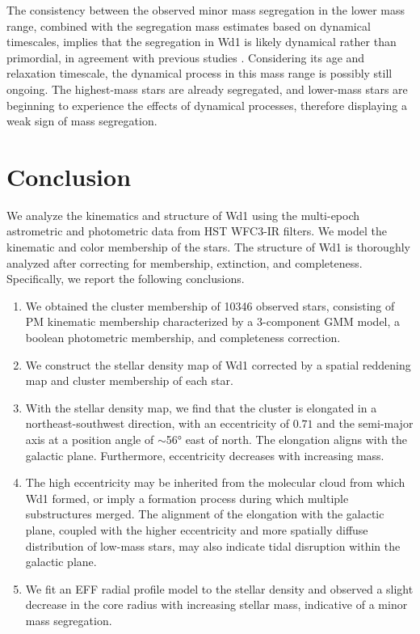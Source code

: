 \documentclass[12pt]{ucsddissertation}
\begin{document}
\begin{CJK*}{UTF8}{gbsn}
The consistency between the observed minor mass segregation in the lower mass range, combined with the segregation mass estimates based on dynamical timescales, implies that the segregation in Wd1 is likely dynamical rather than primordial, in agreement with previous studies \citep[][]{Gennaro-2017}. Considering its age and relaxation timescale, the dynamical process in this mass range is possibly still ongoing. The highest-mass stars are already segregated, and lower-mass stars are beginning to experience the effects of dynamical processes, therefore displaying a weak sign of mass segregation.


\section{Conclusion}
\label{wd1-sec:conclusion}
We analyze the kinematics and structure of Wd1 using the multi-epoch astrometric and photometric data from HST WFC3-IR filters. We model the kinematic and color membership of the stars. The structure of Wd1 is thoroughly analyzed after correcting for membership, extinction, and completeness. Specifically, we report the following conclusions.
\begin{enumerate}[label=\roman*.]
    \item We obtained the cluster membership of \num{10346} observed stars, consisting of PM kinematic membership characterized by a 3-component GMM model, a boolean photometric membership, and completeness correction.
    \item We construct the stellar density map of Wd1 corrected by a spatial reddening map and cluster membership of each star.
    \item With the stellar density map, we find that the cluster is elongated in a northeast-southwest direction, with an eccentricity of $0.71$ and the semi-major axis at a position angle of $\sim$\ang{56} east of north. The elongation aligns with the galactic plane. Furthermore, eccentricity decreases with increasing mass.
    \item The high eccentricity may be inherited from the molecular cloud from which Wd1 formed, or imply a formation process during which multiple substructures merged. The alignment of the elongation with the galactic plane, coupled with the higher eccentricity and more spatially diffuse distribution of low-mass stars, may also indicate tidal disruption within the galactic plane.
    \item We fit an EFF radial profile model to the stellar density and observed a slight decrease in the core radius with increasing stellar mass, indicative of a minor mass segregation.

\end{enumerate}
\end{CJK*}
\end{document}
